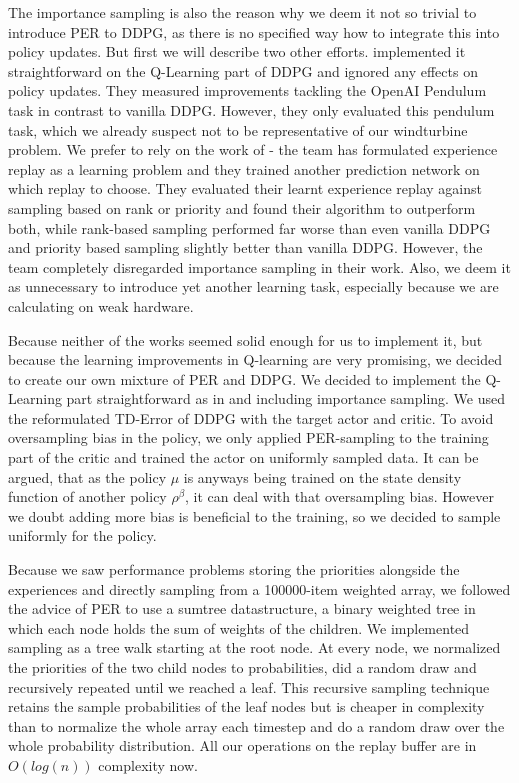 \documentclass[hyperref,german,beleg]{cgvpub}
\begin{document}
The importance sampling is also the reason why we deem it not so trivial to introduce \ac{PER} to \ac{DDPG}, as there is no specified way how to integrate this into policy updates. But first we will describe two other efforts. \cite{houImprovingDDPGPrioritized} implemented it straightforward on the Q-Learning part of \ac{DDPG} and ignored any effects on policy updates. They measured improvements tackling the OpenAI Pendulum task in contrast to vanilla \ac{DDPG}. However, they only evaluated this pendulum task, which we already suspect not to be representative of our windturbine problem. We prefer to rely on the work of \cite{zhaExperienceReplayOptimization2019} - the team has formulated experience replay as a learning problem and they trained another prediction network on which replay to choose. They evaluated their learnt experience replay against sampling based on rank or priority and found their algorithm to outperform both, while rank-based sampling performed far worse than even vanilla \ac{DDPG} and priority based sampling slightly better than vanilla \ac{DDPG}. However, the team completely disregarded importance sampling in their work. Also, we deem it as unnecessary to introduce yet another learning task, especially because we are calculating on weak hardware.

Because neither of the works seemed solid enough for us to implement it, but because the learning improvements in Q-learning are very promising, we decided to create our own mixture of \ac{PER} and \ac{DDPG}. We decided to implement the Q-Learning part straightforward as in \cite{schaulPrioritizedExperienceReplay2016} and including importance sampling. We used the reformulated \ac{TD-Error} of \ac{DDPG} with the target actor and critic. To avoid oversampling bias in the policy, we only applied \ac{PER}-sampling to the training part of the critic and trained the actor on uniformly sampled data. It can be argued, that as the policy $\mu$ is anyways being trained on the state density function of another policy $\rho^{\beta}$, it can deal with that oversampling bias. However we doubt adding more bias is beneficial to the training, so we decided to sample uniformly for the policy.

Because we saw performance problems storing the priorities alongside the experiences and directly sampling from a 100000-item weighted array, we followed the advice of \ac{PER} to use a sumtree datastructure, a binary weighted tree in which each node holds the sum of weights of the children. We implemented sampling as a tree walk starting at the root node. At every node, we normalized the priorities of the two child nodes to probabilities, did a random draw and recursively repeated until we reached a leaf. This recursive sampling technique retains the sample probabilities of the leaf nodes but is cheaper in complexity than to normalize the whole array each timestep and do a random draw over the whole probability distribution. All our operations on the replay buffer are in $O(log(n))$ complexity now.
\end{document}
